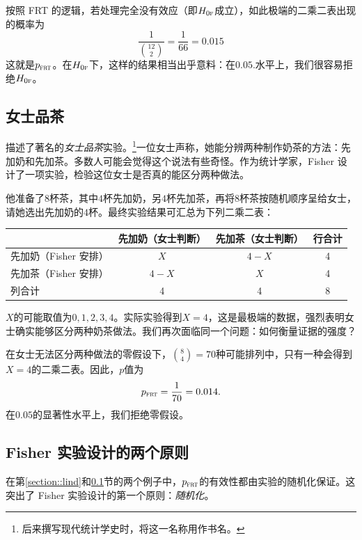 按照 FRT 的逻辑，若处理完全没有效应（即$H_{0\textsc{f}}$成立），如此极端的二乘二表出现的概率为
$$
 \frac{1}{\binom{12}{2}} = \frac{1}{66} = 0.015
$$
这就是$p_{\textsc{frt}}$。在$H_{0\textsc{f}}$下，这样的结果相当出乎意料：在$0.05.$水平上，我们很容易拒绝$H_{0\textsc{f}}$。



\subsection{女士品茶}\label{section::lady-tasting-tea}


\citet{Fisher:1935}描述了著名的{\it 女士品茶}实验。\footnote{后来\citet{salsburg2001lady}撰写现代统计学史时，将这一名称用作书名。}一位女士声称，她能分辨两种制作奶茶的方法：先加奶和先加茶。多数人可能会觉得这个说法有些奇怪。作为统计学家，Fisher 设计了一项实验，检验这位女士是否真的能区分两种做法。 

他准备了$8$杯茶，其中$4$杯先加奶，另$4$杯先加茶，再将$8$杯茶按随机顺序呈给女士，请她选出先加奶的$4$杯。最终实验结果可汇总为下列二乘二表： 

\begin{tabular}{lccc}
\hline 
      &    先加奶（女士判断）&    先加茶（女士判断） & 行合计 \\ \hline
      先加奶（Fisher 安排） & $X$ & $4-X$ & 4\\ 
   先加茶（Fisher 安排） & $4-X$ & $X$ & 4\\
   列合计 & 4 & 4 &8 \\
   \hline 
\end{tabular}

$X$的可能取值为$0, 1, 2, 3, 4$。实际实验得到$X = 4$，这是最极端的数据，强烈表明女士确实能够区分两种奶茶做法。我们再次面临同一个问题：如何衡量证据的强度？


在女士无法区分两种做法的零假设下，$\binom{8}{4} = 70$种可能排列中，只有一种会得到$X=4$的二乘二表。因此，$p$值为
$$
p_{\textsc{frt}} = \frac{1}{70} = 0.014.
$$
在$0.05$的显著性水平上，我们拒绝零假设。 



\subsection{Fisher 实验设计的两个原则}\label{sec::fisherian-principles-experiments}


在第\ref{section::lind}和\ref{section::lady-tasting-tea}节的两个例子中，$p_{\textsc{frt}}$的有效性都由实验的随机化保证。这突出了 Fisher 实验设计的第一个原则：{\it 随机化}。




